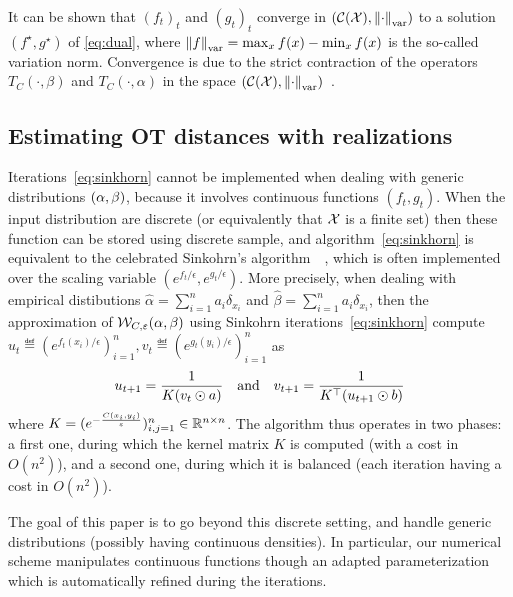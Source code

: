 It can be shown that ${(f_t)}_t$ and ${(g_t)}_t$ converge in $(\mathcal{C}(\mathcal{X}), \left\| \cdot \right\|_{\text{var}})$ to a
solution $(f^\star, g^\star)$ of \eqref{eq:dual}, where $\left\| f
 \right\|_{\text{var}} = \max_x f(x) - \min_x f(x)$ is the so-called variation norm.
% 
Convergence is due to the strict contraction of the operators $T_C(\cdot, \beta)$ and
$T_{C}(\cdot, \alpha)$ in the space $(\mathcal{C}(\mathcal{X}), \left\| \cdot \right\|_{\text{var}})$~\cite{peyre2019computational}.

\subsection{Estimating OT distances with realizations}

Iterations~\eqref{eq:sinkhorn} cannot be implemented when dealing with generic distributions $(\alpha,\beta)$, because it involves continuous functions $(f_t,g_t)$. 
%
When the input distribution are discrete (or equivalently that $\mathcal{X}$ is a finite set) then these function can be stored using discrete sample, and algorithm~\eqref{eq:sinkhorn} is equivalent to the celebrated Sinkohrn's algorithm~~\cite{Sinkhorn64,sinkhorn1967concerning}, which is often implemented over the scaling variable $(e^{f_t/\epsilon},e^{g_t/\epsilon})$.
%
More precisely, when dealing with empirical distibutions $\hat \alpha = \sum_{i=1}^n a_i \delta_{x_i}$ and $\hat \beta =
\sum_{i=1}^n a_i \delta_{x_i}$, then the approximation of $\mathcal{W}_{C,\varepsilon}(\alpha, \beta)$ using Sinkohrn iterations~\eqref{eq:sinkhorn} compute $u_t \eqdef (e^{f_t(x_i)/\epsilon})_{i=1}^n, v_t \eqdef (e^{g_t(y_i)/\epsilon})_{i=1}^n$ as
\begin{equation*}
	u_{t+1} = \frac{1}{ K (v_t \odot a) }
	\quad \text{and} \quad
	v_{t+1} = \frac{1}{ K^\top (u_{t+1} \odot b) }
\end{equation*}
where $K=(e^{-\frac{C(x_i,y_i)}{\varepsilon}})_{i,j=1}^n \in \mathbb{R}^{n \times n}$. 
The algorithm thus operates in two phases: a first one, during which the kernel matrix $K$ is computed (with a cost in $O(n^2)$), and a second one, during which it is balanced (each iteration having a cost in $O(n^2)$).

The goal of this paper is to go beyond this discrete setting, and handle generic distributions (possibly having continuous densities). In particular, our numerical scheme manipulates continuous functions though an adapted parameterization which is automatically refined during the iterations.



